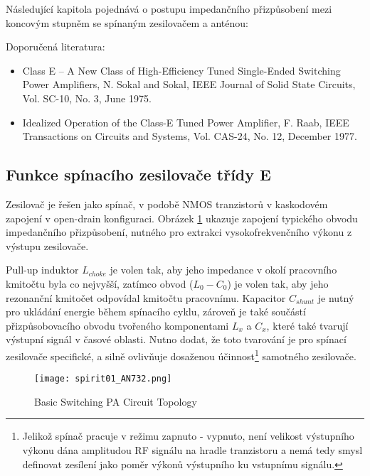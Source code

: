     Následující kapitola pojednává o postupu impedančního přizpůsobení mezi koncovým stupněm se 
    spínaným zesilovačem a anténou: 

    Doporučená literatura:
    \begin{itemize}\addtolength{\itemsep}{-0.5\baselineskip}
      \item Class E – A New Class of High-Efficiency Tuned Single-Ended Switching Power Amplifiers, 
            N. Sokal and Sokal, IEEE Journal of Solid State Circuits, Vol. SC-10, No. 3, June 1975.
      \item Idealized Operation of the Class-E Tuned Power Amplifier, F. Raab, IEEE Transactions on 
            Circuits and Systems, Vol. CAS-24, No. 12, December 1977.
    \end{itemize}
  
    \subsection{Funkce spínacího zesilovače třídy E}       
      Zesilovač je řešen jako spínač, v podobě NMOS tranzistorů v kaskodovém zapojení v open-drain 
      konfiguraci. Obrázek \ref{EXP001:fig_spirit01} ukazuje zapojení typického obvodu impedančního 
      přizpůsobení, nutného pro extrakci vysokofrekvenčního výkonu z výstupu zesilovače.

      Pull-up induktor \(L_{choke}\) je volen tak, aby jeho impedance v okolí pracovního kmitočtu 
      byla co nejvyšší, zatímco obvod (\(L_0 - C_0\)) je volen tak, aby jeho rezonanční 
      kmitočet odpovídal kmitočtu pracovnímu. Kapacitor \(C_{shunt}\) je nutný pro ukládání energie 
      během spínacího cyklu, zároveň je také součástí přizpůsobovacího obvodu tvořeného 
      komponentami \(L_x\) a \(C_x \), které také tvarují výstupní signál v časové  oblasti. Nutno 
      dodat, že toto tvarování je pro spínací zesilovače specifické, a silně ovlivňuje 
      dosaženou účinnost\footnote{Jelikož spínač pracuje v režimu zapnuto - vypnuto, není velikost 
      výstupního výkonu dána amplitudou RF signálu na hradle tranzistoru a nemá tedy smysl definovat 
      zesílení jako poměr výkonů výstupního ku vstupnímu signálu.} samotného zesilovače. 

      \begin{figure}[ht!]  %
        \centering
        \texttt{[image: spirit01\_AN732.png]}
        \caption{Basic Switching PA Circuit Topology \cite[s.~9]{AN648SiliconLabs}}
        \label{EXP001:fig_spirit01}
      \end{figure}
      
